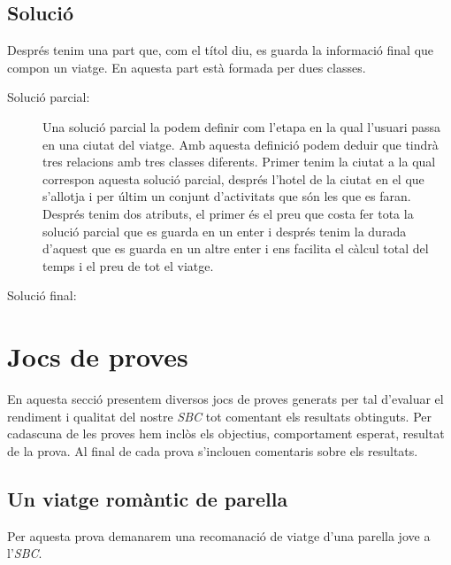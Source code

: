 \documentclass[11pt,a4paper]{article}
\begin{document}
\subsection{Solució} 
Després tenim una part que, com el títol diu, es guarda la informació final que compon un viatge. En aquesta part està formada per dues classes.

\begin{description}
\item[Solució parcial:] Una solució parcial la podem definir com l'etapa en la qual l'usuari passa en una ciutat del viatge. Amb aquesta definició podem deduir que tindrà tres relacions amb tres classes diferents.
Primer tenim la ciutat a la qual correspon aquesta solució parcial, després l'hotel de la ciutat en el que s'allotja i per últim un conjunt d'activitats que són les que es faran.
Després tenim dos atributs, el primer és el preu que costa fer tota la solució parcial que es guarda en un enter i després tenim la durada d'aquest que es guarda en un altre enter i ens facilita el càlcul total del temps i el preu de tot el viatge.
\item[Solució final:]

\end{description}

\clearpage

\section{Jocs de proves}
En aquesta secció presentem diversos jocs de proves generats per tal d'evaluar el rendiment i qualitat del nostre \emph{SBC} tot comentant els resultats obtinguts. Per cadascuna de les proves hem inclòs els objectius, comportament esperat, resultat de la prova. Al final de cada prova s'inclouen comentaris sobre els resultats.

\subsection{Un viatge romàntic de parella}
Per aquesta prova demanarem una recomanació de viatge d'una parella jove a l'\emph{SBC}.\\
\end{document}
